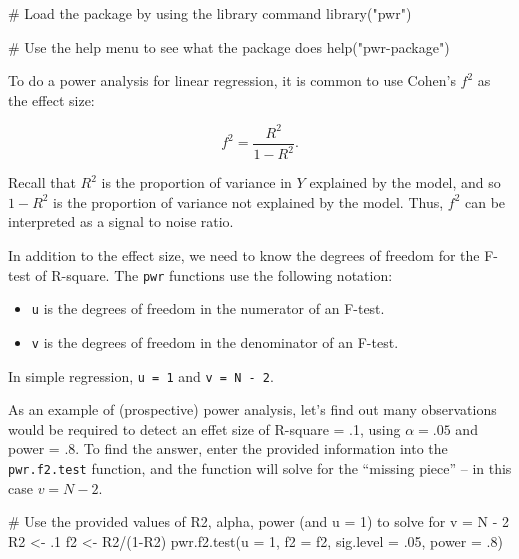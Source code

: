 \documentclass[
  letterpaper,
  DIV=11,
  numbers=noendperiod]{scrreprt}
\newenvironment{Shaded}{\begin{snugshade}}{\end{snugshade}}
\newcommand{\AttributeTok}[1]{\textcolor[rgb]{0.40,0.45,0.13}{#1}}
\newcommand{\CommentTok}[1]{\textcolor[rgb]{0.37,0.37,0.37}{#1}}
\newcommand{\DecValTok}[1]{\textcolor[rgb]{0.68,0.00,0.00}{#1}}
\newcommand{\FunctionTok}[1]{\textcolor[rgb]{0.28,0.35,0.67}{#1}}
\newcommand{\NormalTok}[1]{\textcolor[rgb]{0.00,0.23,0.31}{#1}}
\newcommand{\OtherTok}[1]{\textcolor[rgb]{0.00,0.23,0.31}{#1}}
\newcommand{\SpecialCharTok}[1]{\textcolor[rgb]{0.37,0.37,0.37}{#1}}
\newcommand{\StringTok}[1]{\textcolor[rgb]{0.13,0.47,0.30}{#1}}
\providecommand{\tightlist}{%
  \setlength{\itemsep}{0pt}\setlength{\parskip}{0pt}}\usepackage{longtable,booktabs,array}
\begin{document}
\begin{Shaded}
\begin{Highlighting}[]
\CommentTok{\# Load the package by using the library command}
\FunctionTok{library}\NormalTok{(}\StringTok{"pwr"}\NormalTok{)}
\end{Highlighting}
\end{Shaded}

\begin{Shaded}
\begin{Highlighting}[]
\CommentTok{\# Use the help menu to see what the package does}
\FunctionTok{help}\NormalTok{(}\StringTok{"pwr{-}package"}\NormalTok{)}
\end{Highlighting}
\end{Shaded}

To do a power analysis for linear regression, it is common to use
Cohen's \(f^2\) as the effect size:

\[f^2 = \frac{R^2}{1-R^2}.\]

Recall that \(R^2\) is the proportion of variance in \(Y\) explained by
the model, and so \(1 - R^2\) is the proportion of variance not
explained by the model. Thus, \(f^2\) can be interpreted as a signal to
noise ratio.

In addition to the effect size, we need to know the degrees of freedom
for the F-test of R-square. The \texttt{pwr} functions use the following
notation:

\begin{itemize}
\tightlist
\item
  \texttt{u} is the degrees of freedom in the numerator of an F-test.
\item
  \texttt{v} is the degrees of freedom in the denominator of an F-test.
\end{itemize}

In simple regression, \texttt{u\ =\ 1} and \texttt{v\ =\ N\ -\ 2}.

As an example of (prospective) power analysis, let's find out many
observations would be required to detect an effet size of R-square = .1,
using \(\alpha = .05\) and power = .8. To find the answer, enter the
provided information into the \texttt{pwr.f2.test} function, and the
function will solve for the ``missing piece'' -- in this case
\(v = N - 2\).

\begin{Shaded}
\begin{Highlighting}[]
\CommentTok{\# Use the provided values of R2, alpha, power (and u = 1) to solve for v = N {-} 2}
\NormalTok{R2 }\OtherTok{\textless{}{-}}\NormalTok{ .}\DecValTok{1}
\NormalTok{f2 }\OtherTok{\textless{}{-}}\NormalTok{ R2}\SpecialCharTok{/}\NormalTok{(}\DecValTok{1}\SpecialCharTok{{-}}\NormalTok{R2)}
\FunctionTok{pwr.f2.test}\NormalTok{(}\AttributeTok{u =} \DecValTok{1}\NormalTok{, }\AttributeTok{f2 =}\NormalTok{ f2, }\AttributeTok{sig.level =}\NormalTok{ .}\DecValTok{05}\NormalTok{, }\AttributeTok{power =}\NormalTok{ .}\DecValTok{8}\NormalTok{)}
\end{Highlighting}
\end{Shaded}
\end{document}
